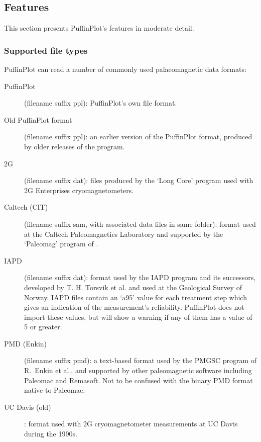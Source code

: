 \documentclass[a4paper,british]{article}
\newcommand{\ppcmd}[1]{\textsf{#1}} %
\newcommand{\caps}[1]{\MakeTextUppercase{#1}} %
\begin{document}
\subsection{Features}

This section presents PuffinPlot's features in moderate detail.

\subsubsection{\label{sec:file-types}Supported file types}

PuffinPlot can read a number of commonly used palaeomagnetic data
formats:

\begin{description}

\item[PuffinPlot] (filename suffix \ppcmd{ppl}): PuffinPlot's own file
  format.

\item[Old PuffinPlot format] (filename suffix \ppcmd{ppl}): an earlier
  version of the PuffinPlot format, produced by older releases of
  the program.

\item[2G] (filename suffix \ppcmd{dat}): files produced by the `Long
  Core' program used with 2G Enterprises cryomagnetometers.

\item[Caltech (CIT)] (filename suffix \ppcmd{sam}, with associated data
  files in same folder): format used at the Caltech Paleomagnetics
  Laboratory and supported by the `Paleomag' program of
  \cite{jones2002paleomag}.

\item[IAPD] (filename suffix \ppcmd{dat}): format used by the
  \caps{iapd} program and its successors, developed by T. H. Torsvik et
  al. and used at the Geological Survey of Norway. IAPD files contain an
  `a95' value for each treatment step which gives an indication of the
  measurement's reliability. PuffinPlot does not import these values,
  but will show a warning if any of them has a value of 5 or greater.

\item[PMD (Enkin)] (filename suffix \ppcmd{pmd}): a text-based format
  used by the PMGSC program of R.~Enkin et al., and supported by other
  paleomagnetic software including Paleomac and Remasoft. Not to be
  confused with the binary PMD format native to Paleomac.
  
\item[UC Davis (old)]: format used with 2G cryomagnetometer measurements
  at UC Davis during the 1990s.
  

\end{description}
\end{document}
